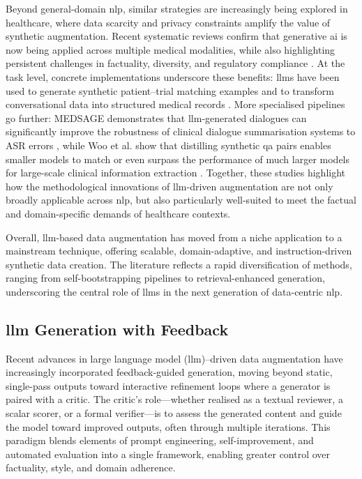 Beyond general-domain \gls{nlp}, similar strategies are increasingly being explored in healthcare, where data scarcity and privacy constraints amplify the value of synthetic augmentation. Recent systematic reviews confirm that generative \gls{ai} is now being applied across multiple medical modalities, while also highlighting persistent challenges in factuality, diversity, and regulatory compliance \citep{Ibrahim2025}. At the task level, concrete implementations underscore these benefits: \glspl{llm} have been used to generate synthetic patient–trial matching examples \citep{yuan2023healthcare_da_trial_matching} and to transform conversational data into structured medical records \citep{pulsar_mediqasum_2023}. More specialised pipelines go further: MEDSAGE demonstrates that \gls{llm}-generated dialogues can significantly improve the robustness of clinical dialogue summarisation systems to ASR errors \citep{ramesh2025}, while Woo et al. show that distilling synthetic \gls{qa} pairs enables smaller models to match or even surpass the performance of much larger models for large-scale clinical information extraction \citep{woo2025synthetic}. Together, these studies highlight how the methodological innovations of \gls{llm}-driven augmentation are not only broadly applicable across \gls{nlp}, but also particularly well-suited to meet the factual and domain-specific demands of healthcare contexts.

Overall, \gls{llm}-based data augmentation has moved from a niche application to a mainstream technique, offering scalable, domain-adaptive, and instruction-driven synthetic data creation. The literature reflects a rapid diversification of methods, ranging from self-bootstrapping pipelines to retrieval-enhanced generation, underscoring the central role of \glspl{llm} in the next generation of data-centric \gls{nlp}.
\subsection{\gls{llm} Generation with Feedback}

Recent advances in large language model (\gls{llm})–driven data augmentation have increasingly incorporated feedback-guided generation, moving beyond static, single-pass outputs toward interactive refinement loops where a generator is paired with a critic. The critic’s role—whether realised as a textual reviewer, a scalar scorer, or a formal verifier—is to assess the generated content and guide the model toward improved outputs, often through multiple iterations. This paradigm blends elements of prompt engineering, self-improvement, and automated evaluation into a single framework, enabling greater control over factuality, style, and domain adherence.

